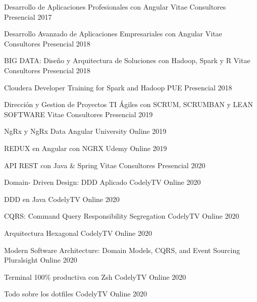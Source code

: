 
\begin{cvhonors}
  \cvhonor
    {Desarrollo de Aplicaciones Profesionales con Angular}
    {Vitae Consultores}
    {Presencial}
    {2017}

  \cvhonor
    {Desarrollo Avanzado de Aplicaciones Empresariales con Angular}
    {Vitae Consultores}
    {Presencial}
    {2018}

  \cvhonor
    {BIG DATA: Diseño y Arquitectura de Soluciones con Hadoop, Spark y R}
    {Vitae Consultores}
    {Presencial}
    {2018}

  \cvhonor
    {Cloudera Developer Training for Spark and Hadoop}
    {PUE}
    {Presencial}
    {2018}

  \cvhonor
    {Dirección y Gestion de Proyectos TI Ágiles con SCRUM, SCRUMBAN y LEAN SOFTWARE}
    {Vitae Consultores}
    {Presencial}
    {2019}

  \cvhonor
    {NgRx y NgRx Data}
    {Angular University}
    {Online}
    {2019}

  \cvhonor
    {REDUX en Angular con NGRX}
    {Udemy}
    {Online}
    {2019}

  \cvhonor
    {API REST con Java \& Spring}
    {Vitae Consultores}
    {Presencial}
    {2020}

  \cvhonor
    {Domain- Driven Design: DDD Aplicado}
    {CodelyTV}
    {Online}
    {2020}

  \cvhonor
    {DDD en Java}
    {CodelyTV}
    {Online}
    {2020}

  \cvhonor
    {CQRS: Command Query Responsibility Segregation}
    {CodelyTV}
    {Online}
    {2020}

  \cvhonor
    {Arquitectura Hexagonal}
    {CodelyTV}
    {Online}
    {2020}

  \cvhonor
    {Modern Software Architecture: Domain Models, CQRS, and Event Sourcing}
    {Pluralsight}
    {Online}
    {2020}

  \cvhonor
    {Terminal 100\% productiva con Zsh}
    {CodelyTV}
    {Online}
    {2020}

  \cvhonor
    {Todo sobre los dotfiles}
    {CodelyTV}
    {Online}
    {2020}
\end{cvhonors}
